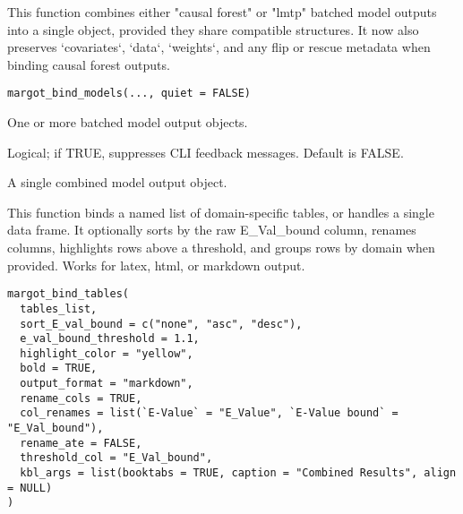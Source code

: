 \documentclass[a4paper]{book}
\begin{document}
%
\begin{Description}
This function combines either "causal forest" or "lmtp" batched model outputs
into a single object, provided they share compatible structures.  It now also
preserves `covariates`, `data`, `weights`, and any flip or rescue metadata
when binding causal forest outputs.
\end{Description}
%
\begin{Usage}
\begin{verbatim}
margot_bind_models(..., quiet = FALSE)
\end{verbatim}
\end{Usage}
%
\begin{Arguments}
\begin{ldescription}
\item[\code{...}] One or more batched model output objects.

\item[\code{quiet}] Logical; if TRUE, suppresses CLI feedback messages. Default is FALSE.
\end{ldescription}
\end{Arguments}
%
\begin{Value}
A single combined model output object.
\end{Value}
%
\begin{Description}
This function binds a named list of domain-specific tables, or handles a single data frame.
It optionally sorts by the raw E\_Val\_bound column, renames columns, highlights rows above a threshold,
and groups rows by domain when provided. Works for latex, html, or markdown output.
\end{Description}
%
\begin{Usage}
\begin{verbatim}
margot_bind_tables(
  tables_list,
  sort_E_val_bound = c("none", "asc", "desc"),
  e_val_bound_threshold = 1.1,
  highlight_color = "yellow",
  bold = TRUE,
  output_format = "markdown",
  rename_cols = TRUE,
  col_renames = list(`E-Value` = "E_Value", `E-Value bound` = "E_Val_bound"),
  rename_ate = FALSE,
  threshold_col = "E_Val_bound",
  kbl_args = list(booktabs = TRUE, caption = "Combined Results", align = NULL)
)
\end{verbatim}
\end{Usage}
%
\end{document}
